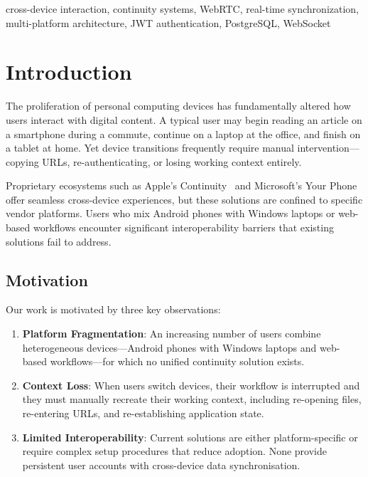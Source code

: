 \documentclass[conference]{IEEEtran}
\begin{document}
\begin{IEEEkeywords}
cross-device interaction, continuity systems, WebRTC, real-time synchronization, multi-platform architecture, JWT authentication, PostgreSQL, WebSocket
\end{IEEEkeywords}

\section{Introduction}

The proliferation of personal computing devices has fundamentally altered how users interact with digital content. A typical user may begin reading an article on a smartphone during a commute, continue on a laptop at the office, and finish on a tablet at home. Yet device transitions frequently require manual intervention---copying URLs, re-authenticating, or losing working context entirely.

Proprietary ecosystems such as Apple's Continuity~\cite{apple_continuity} and Microsoft's Your Phone~\cite{microsoft_yourphone} offer seamless cross-device experiences, but these solutions are confined to specific vendor platforms. Users who mix Android phones with Windows laptops or web-based workflows encounter significant interoperability barriers that existing solutions fail to address.

\subsection{Motivation}

Our work is motivated by three key observations:

\begin{enumerate}
    \item \textbf{Platform Fragmentation}: An increasing number of users combine heterogeneous devices---Android phones with Windows laptops and web-based workflows---for which no unified continuity solution exists.
    \item \textbf{Context Loss}: When users switch devices, their workflow is interrupted and they must manually recreate their working context, including re-opening files, re-entering URLs, and re-establishing application state.
    \item \textbf{Limited Interoperability}: Current solutions are either platform-specific or require complex setup procedures that reduce adoption. None provide persistent user accounts with cross-device data synchronisation.
\end{enumerate}
\end{document}

